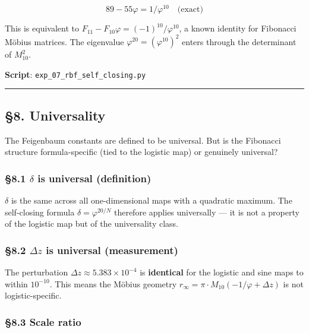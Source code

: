 \documentclass[
  11pt,
  a4paper]{article}
\begin{document}
\[89 - 55\varphi = 1/\varphi^{10} \quad \text{(exact)}\]

This is equivalent to
\(F_{11} - F_{10}\varphi = (-1)^{10}/\varphi^{10}\), a known identity
for Fibonacci Möbius matrices. The eigenvalue
\(\varphi^{20} = (\varphi^{10})^2\) enters through the determinant of
\(M_{10}^2\).

\textbf{Script}: \texttt{exp\_07\_rbf\_self\_closing.py}

\begin{center}\rule{0.5\linewidth}{0.5pt}\end{center}

\subsection{§8. Universality}\label{universality}

The Feigenbaum constants are defined to be universal. But is the
Fibonacci structure formula-specific (tied to the logistic map) or
genuinely universal?

\subsubsection{\texorpdfstring{§8.1 \(\delta\) is universal
(definition)}{§8.1 \textbackslash delta is universal (definition)}}\label{delta-is-universal-definition}

\(\delta\) is the same across all one-dimensional maps with a quadratic
maximum. The self-closing formula \(\delta = \varphi^{20/N}\) therefore
applies universally --- it is not a property of the logistic map but of
the universality class.

\subsubsection{\texorpdfstring{§8.2 \(\Delta z\) is universal
(measurement)}{§8.2 \textbackslash Delta z is universal (measurement)}}\label{delta-z-is-universal-measurement}

The perturbation \(\Delta z \approx 5.383 \times 10^{-4}\) is
\textbf{identical} for the logistic and sine maps to within
\(10^{-10}\). This means the Möbius geometry
\(r_\infty = \pi \cdot M_{10}(-1/\varphi + \Delta z)\) is not
logistic-specific.

\subsubsection{§8.3 Scale ratio}\label{scale-ratio}
\end{document}
